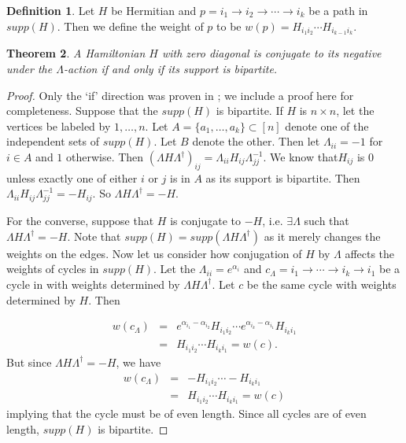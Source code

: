 \documentclass[twocolumn,superscriptaddress]{revtex4-1}
\theoremstyle{plain}
\newtheorem{theorem}{Theorem}[section]
\theoremstyle{definition}
\newtheorem{defn}[theorem]{Definition}%
\theoremstyle{definition}
\theoremstyle{definition}
\theoremstyle{definition}
\theoremstyle{definition}
\theoremstyle{definition}
\begin{document}
\begin{defn}
 Let $H$ be Hermitian and $p=i_1\to i_2\to\cdots\to i_k$ be a path in $supp(H)$. Then we define the weight of $p$ to be $w(p)=H_{i_1i_2}\cdots H_{i_{k-1}i_k}$.
\end{defn}


\begin{theorem}\label{thm:conjtoneg}
 A Hamiltonian $H$ with zero diagonal is conjugate to its negative under the $\Lambda$-action if and only if its support is bipartite.
\end{theorem}
\begin{proof}
 Only the `if' direction was proven in \cite{Z13}; we include a proof here for completeness. Suppose that the $supp(H)$ is bipartite. If $H$ is $n\times n$, let the vertices be labeled by $1,\dots, n$. Let $A=\{a_1,\dots,a_k\}\subset[n]$ denote one of the independent sets of $supp(H)$. Let $B$ denote the other. Then let $\Lambda_{ii}=-1$ for $i\in A$ and $1$ otherwise. Then $(\Lambda H\Lambda^\dagger)_{ij}=\Lambda_{ii}H_{ij}\Lambda_{jj}^{-1}$. We know that$H_{ij}$ is 0 unless exactly one of either $i$ or $j$ is in $A$ as its support is bipartite. Then $\Lambda_{ii}H_{ij}\Lambda_{jj}^{-1}=-H_{ij}$. So $\Lambda H\Lambda^\dagger=-H$.
 
 For the converse, suppose that $H$ is conjugate to $-H$, i.e. $\exists\Lambda$ such that $\Lambda H\Lambda^\dagger=-H$. Note that $supp(H)=supp(\Lambda H\Lambda^\dagger)$ as it merely changes the weights on the edges. Now let us consider how conjugation of $H$ by $\Lambda$ affects the weights of cycles in $supp(H)$. Let the $\Lambda_{ii}=e^{\alpha_i}$ and $c_\Lambda=i_1\to\cdots\to i_k\to i_1$ be a cycle in with weights determined by $\Lambda H\Lambda^\dagger$. Let $c$ be the same cycle with weights determined by $H$. Then 

\begin{eqnarray}
w(c_\Lambda)&=&e^{\alpha_{i_1}-\alpha_{i_2}}H_{i_1i_2}\cdots e^{\alpha_{i_k}-\alpha_{i_1}}H_{i_ki_1}\\
&=&H_{i_1i_2}\cdots H_{i_ki_1}=w(c).\nonumber 
\end{eqnarray}
 But since $\Lambda H\Lambda^\dagger=-H$, we have
 \begin{eqnarray}w(c_\Lambda)&=&-H_{i_1i_2}\cdots-H_{i_ki_1}\\&=&H_{i_1i_2}\cdots H_{i_ki_1}=w(c)\nonumber\end{eqnarray}
 implying that the cycle must be of even length. Since all cycles are of even length, $supp(H)$ is bipartite.
\end{proof}
\end{document}
